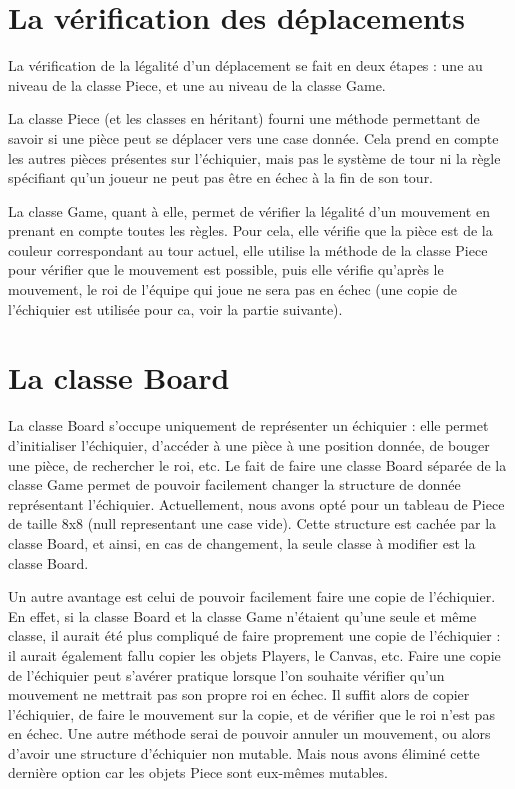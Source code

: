 \documentclass[11pt]{article}
\begin{document}
\section{La vérification des déplacements}

La vérification de la légalité d'un déplacement se fait en deux étapes : une au niveau de la classe Piece, et une au niveau de la classe Game.\newline

La classe Piece (et les classes en héritant) fourni une méthode permettant de savoir si une pièce peut se déplacer vers une case donnée. Cela prend en compte les autres pièces présentes sur l'échiquier, mais pas le système de tour ni la règle spécifiant qu'un joueur ne peut pas être en échec à la fin de son tour.\newline

La classe Game, quant à elle, permet de vérifier la légalité d'un mouvement en prenant en compte toutes les règles. Pour cela, elle vérifie que la pièce est de la couleur correspondant au tour actuel, elle utilise la méthode de la classe Piece pour vérifier que le mouvement est possible, puis elle vérifie qu'après le mouvement, le roi de l'équipe qui joue ne sera pas en échec (une copie de l'échiquier est utilisée pour ca, voir la partie suivante).

\section{La classe Board}

La classe Board s'occupe uniquement de représenter un échiquier : elle permet d'initialiser l'échiquier, d'accéder à une pièce à une position donnée, de bouger une pièce, de rechercher le roi, etc. Le fait de faire une classe Board séparée de la classe Game permet de pouvoir facilement changer la structure de donnée représentant l'échiquier. Actuellement, nous avons opté pour un tableau de Piece de taille 8x8 (null representant une case vide). Cette structure est cachée par la classe Board, et ainsi, en cas de changement, la seule classe à modifier est la classe Board.\newline

Un autre avantage est celui de pouvoir facilement faire une copie de l'échiquier. En effet, si la classe Board et la classe Game n'étaient qu'une seule et même classe, il aurait été plus compliqué de faire proprement une copie de l'échiquier : il aurait également fallu copier les objets Players, le Canvas, etc.
Faire une copie de l'échiquier peut s'avérer pratique lorsque l'on souhaite vérifier qu'un mouvement ne mettrait pas son propre roi en échec. Il suffit alors de copier l'échiquier, de faire le mouvement sur la copie, et de vérifier que le roi n'est pas en échec. Une autre méthode serai de pouvoir annuler un mouvement, ou alors d'avoir une structure d'échiquier non mutable. Mais nous avons éliminé cette dernière option car les objets Piece sont eux-mêmes mutables.
\end{document}
